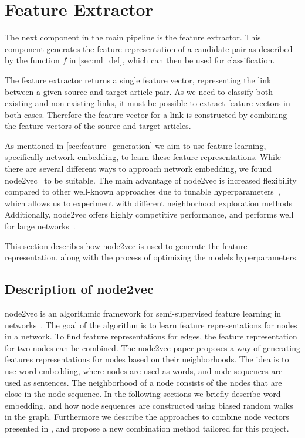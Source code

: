 \section{Feature Extractor}\label{feature_extractor}
The next component in the main pipeline is the feature extractor. This component generates the feature representation of a candidate pair as described by the function $f$ in \cref{sec:ml_def}, which can then be used for classification.

The feature extractor returns a single feature vector, representing the link between a given source and target article pair. As we need to classify both existing and non-existing links, it must be possible to extract feature vectors in both cases. Therefore the feature vector for a link is constructed by combining the feature vectors of the source and target articles.

As mentioned in \cref{sec:feature_generation} we aim to use feature learning, specifically network embedding, to learn these feature representations. While there are several different ways to approach network embedding, we found node2vec~\cite{node2vec} to be suitable. The main advantage of node2vec is increased flexibility compared to other well-known approaches due to tunable hyperparameters~\cite{node2vec}, which allows us to experiment with different neighborhood exploration methods Additionally, node2vec offers highly competitive performance, and performs well for large networks~\cite{node2vec}.

This section describes how node2vec is used to generate the feature representation, along with the process of optimizing the models hyperparameters.

\subsection{Description of node2vec}
\label{sec:node2vec}
node2vec is an algorithmic framework for semi-supervised feature learning in networks~\cite{node2vec}. The goal of the algorithm is to learn feature representations for nodes in a network. To find feature representations for edges, the feature representation for two nodes can be combined. The node2vec paper proposes a way of generating features representations for nodes based on their neighborhoods. The idea is to use word embedding, where nodes are used as words, and node sequences are used as sentences. The neighborhood of a node consists of the nodes that are close in the node sequence. In the following sections we briefly describe word embedding, and how node sequences are constructed using biased random walks in the graph. Furthermore we describe the approaches to combine node vectors presented in \cite{node2vec}, and propose a new combination method tailored for this project.

